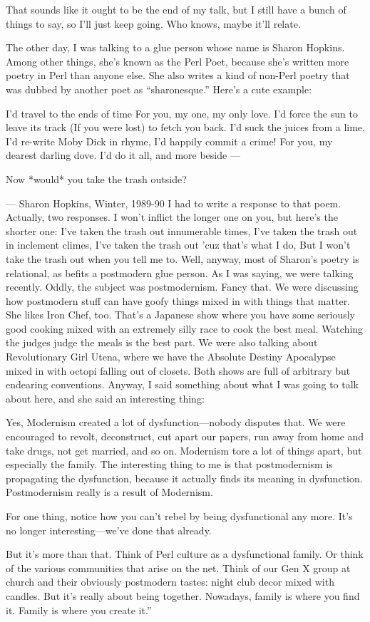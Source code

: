 That sounds like it ought to be the end of my talk, but I still have a bunch
of things to say, so I'll just keep going. Who knows, maybe it'll relate.

The other day, I was talking to a glue person whose name is Sharon Hopkins.
Among other things, she's known as the Perl Poet, because she's written more
poetry in Perl than anyone else. She also writes a kind of non-Perl poetry
that was dubbed by another poet as ``sharonesque.'' Here's a cute example:
\medbreak
{\narrower\obeylines
I'd travel to the ends of time
For you, my one, my only love.
I'd force the sun to leave its track
(If you were lost) to fetch you back.
I'd suck the juices from a lime,
I'd re-write Moby Dick in rhyme,
I'd happily commit a crime!
For you, my dearest darling dove.
I'd do it all, and more beside --- 
 
Now *would* you take the trash outside?
\medskip}
\hskip 1in--- Sharon Hopkins, Winter, 1989-90
\medbreak
\noindent I had to write a response to that poem. Actually, two responses. I won't
inflict the longer one on you, but here's the shorter one:
\medbreak
{\narrower\obeylines
I've taken the trash out innumerable times,
I've taken the trash out in inclement climes,
I've taken the trash out 'cuz that's what I do,
But I won't take the trash out when you tell me to.
\medbreak}
\noindent Well, anyway, most of Sharon's poetry is relational, as befits a postmodern
glue person. As I was saying, we were talking recently. Oddly, the subject
was postmodernism. Fancy that. We were discussing how postmodern stuff can
have goofy things mixed in with things that matter. She likes Iron Chef, too.
That's a Japanese show where you have some seriously good cooking mixed with
an extremely silly race to cook the best meal. Watching the judges judge the
meals is the best part. We were also talking about Revolutionary Girl Utena,
where we have the Absolute Destiny Apocalypse mixed in with octopi falling
out of closets. Both shows are full of arbitrary but endearing conventions.
Anyway, I said something about what I was going to talk about here, and she
said an interesting thing:
\medbreak
{\narrower\noindent
{}Yes, Modernism created a lot of
dysfunction---nobody disputes that. We were encouraged to revolt, deconstruct,
cut apart our papers, run away from home and take drugs, not get married, and
so on. Modernism tore a lot of things apart, but especially the family. The
interesting thing to me is that postmodernism is propagating the dysfunction,
because it actually finds its meaning in dysfunction. Postmodernism really is
a result of Modernism.

For one thing, notice how you can't rebel by being dysfunctional any more.
It's no longer interesting---we've done that already.

But it's more than that. Think of Perl culture as a dysfunctional family. Or
think of the various communities that arise on the net. Think of our Gen X
group at church and their obviously postmodern tastes: night club decor mixed
with candles. But it's really about being together. Nowadays, family is where
you find it. Family is where you create it.''\medbreak}

